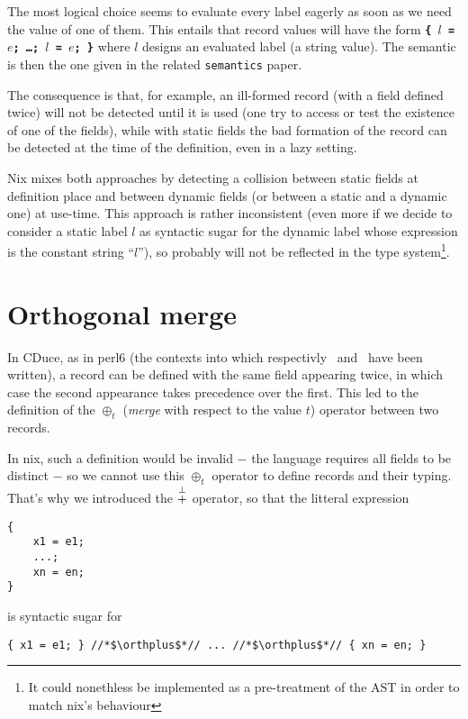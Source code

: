 The most logical choice seems to evaluate every label eagerly as soon as we
need the value of one of them. This entails that record values will have the
form \texttt{\bfseries \{ $l$ = $e$; \ldots{}; $l$ = $e$; \}} where $l$ designs
an evaluated label (a string value). The semantic is then the one given in the
related \texttt{semantics} paper.

The consequence is that, for example, an ill-formed record (with a field
defined twice) will not be detected until it is used (one try to access or test
the existence of one of the fields), while with static fields the bad formation
of the record can be detected at the time of the definition, even in a lazy
setting.

Nix mixes both approaches by detecting a collision between static fields at
definition place and between dynamic fields (or between a static and a dynamic
one) at use-time. This approach is rather inconsistent (even more if we decide
to consider a static label $l$ as syntactic sugar for the dynamic label whose
expression is the constant string ``$l$''), so probably will not be reflected in
the type system\footnote{It could nonethless be implemented as a pre-treatment
of the AST in order to match nix's behaviour}.

\section{Orthogonal merge}

In CDuce, as in perl6 (the contexts into which respectivly~\cite{Fri04}
and~\cite{Cas15} have been written), a record can be defined with the same field
appearing twice, in which case the second appearance takes precedence over the
first. This led to the definition of the $\oplus_t$ (\emph{merge} with
respect to the value $t$) operator between two records.

In nix, such a definition would be invalid − the language requires all
fields to be distinct − so we cannot use this $\oplus_t$ operator to
define records and their typing. That's why we introduced the $\overset{\bot}{+}$
operator, so that the litteral expression

\begin{lstlisting}
{
    x1 = e1;
    ...;
    xn = en;
}
\end{lstlisting}

is syntactic sugar for

\begin{lstlisting}
{ x1 = e1; } //*$\orthplus$*// ... //*$\orthplus$*// { xn = en; }
\end{lstlisting}

